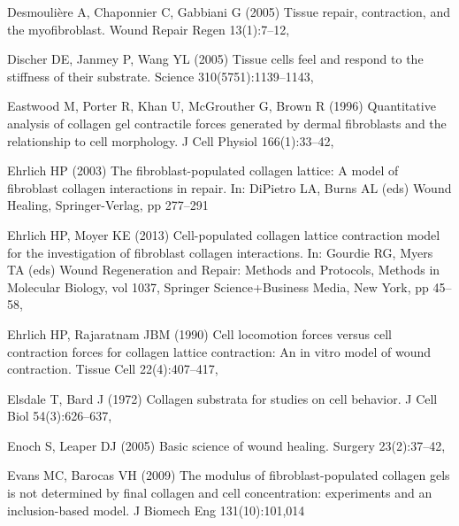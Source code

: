 \begin{thebibliography}{124}
Desmouli{\`e}re A, Chaponnier C, Gabbiani G (2005) Tissue repair, contraction,
  and the myofibroblast. Wound Repair Regen 13(1):7--12,

Discher DE, Janmey P, Wang YL (2005) Tissue cells feel and respond to the
  stiffness of their substrate. Science 310(5751):1139--1143,

Eastwood M, Porter R, Khan U, McGrouther G, Brown R (1996) Quantitative
  analysis of collagen gel contractile forces generated by dermal fibroblasts
  and the relationship to cell morphology. J Cell Physiol 166(1):33--42,

Ehrlich HP (2003) The fibroblast-populated collagen lattice: A model of
  fibroblast collagen interactions in repair. In: DiPietro LA, Burns AL (eds)
  Wound Healing, Springer-Verlag, pp 277--291

Ehrlich HP, Moyer KE (2013) Cell-populated collagen lattice contraction model
  for the investigation of fibroblast collagen interactions. In: Gourdie RG,
  Myers TA (eds) Wound Regeneration and Repair: Methods and Protocols, Methods
  in Molecular Biology, vol 1037, Springer Science+Business Media, New York, pp
  45--58, 

Ehrlich HP, Rajaratnam JBM (1990) Cell locomotion forces versus cell
  contraction forces for collagen lattice contraction: An in vitro model of
  wound contraction. Tissue Cell 22(4):407--417,

Elsdale T, Bard J (1972) Collagen substrata for studies on cell behavior. J
  Cell Biol 54(3):626--637, 

Enoch S, Leaper DJ (2005) Basic science of wound healing. Surgery 23(2):37--42,

Evans MC, Barocas VH (2009) The modulus of fibroblast-populated collagen gels
  is not determined by final collagen and cell concentration: experiments and
  an inclusion-based model. J Biomech Eng 131(10):101,014


\end{thebibliography}

